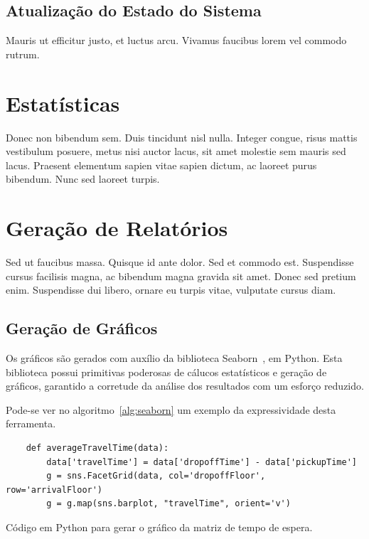 \subsection{Atualização do Estado do Sistema}

Mauris ut efficitur justo, et luctus arcu. Vivamus faucibus lorem vel commodo
rutrum.

\section{Estatísticas}

Donec non bibendum sem. Duis tincidunt nisl nulla. Integer congue, risus mattis
vestibulum posuere, metus nisi auctor lacus, sit amet molestie sem mauris sed
lacus. Praesent elementum sapien vitae sapien dictum, ac laoreet purus bibendum.
Nunc sed laoreet turpis.

\section{Geração de Relatórios}

Sed ut faucibus massa. Quisque id ante dolor. Sed et commodo est. Suspendisse
cursus facilisis magna, ac bibendum magna gravida sit amet. Donec sed pretium
enim. Suspendisse dui libero, ornare eu turpis vitae, vulputate cursus diam.

\subsection{Geração de Gráficos}

Os gráficos são gerados com auxílio da biblioteca Seaborn~\cite{seaborn}, em Python.
Esta biblioteca possui primitivas poderosas de cálucos estatísticos e geração de
gráficos, garantido a corretude da análise dos resultados com um esforço reduzido.

Pode-se ver no algoritmo~\ref{alg:seaborn} um exemplo da expressividade desta ferramenta.

\begin{algorithm}[htb]
  \centering
    \begin{verbatim}
    def averageTravelTime(data):
        data['travelTime'] = data['dropoffTime'] - data['pickupTime']
        g = sns.FacetGrid(data, col='dropoffFloor', row='arrivalFloor')
        g = g.map(sns.barplot, "travelTime", orient='v')
    \end{verbatim}
  \caption{Código em Python para gerar o gráfico da matriz de tempo de espera.}
  \label{alg:seaborn}
\end{algorithm}


